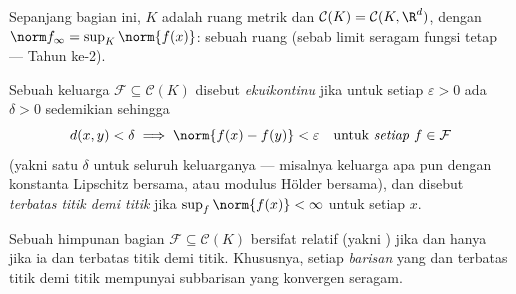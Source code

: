 Sepanjang bagian ini, $K$ adalah ruang metrik \emph{} dan $\mathcal
C(K) = \mathcal C(K, \R^d)$, dengan $\norm f_\infty = \sup_K
\norm{f(x)}$: sebuah ruang  (sebab limit seragam fungsi 
tetap  --- Tahun ke-2).

\begin{definition}\label{def:b3:complete:equicontinuous}
Sebuah keluarga $\mathcal F \subseteq \mathcal C(K)$ disebut
\emph{ekuikontinu} jika untuk setiap
$\varepsilon > 0$ ada $\delta > 0$ sedemikian sehingga
\[
d(x, y) < \delta \implies \norm{f(x) - f(y)} < \varepsilon
\quad\text{untuk \emph{setiap} } f \in \mathcal F
\]
(yakni satu $\delta$ untuk seluruh keluarganya --- misalnya keluarga apa pun dengan
konstanta Lipschitz bersama, atau modulus Hölder bersama), dan disebut
\emph{terbatas titik demi titik} jika $\sup_{f}\norm{f(x)} < \infty$ untuk
setiap $x$.
\end{definition}

\begin{theorem}\label{thm:b3:complete:ascoli}
Sebuah himpunan bagian $\mathcal F \subseteq \mathcal C(K)$ bersifat
 relatif (yakni  ) jika dan hanya jika ia  dan
terbatas titik demi titik. Khususnya, setiap \emph{barisan} yang  dan
terbatas titik demi titik mempunyai subbarisan yang konvergen
seragam.
\end{theorem}

